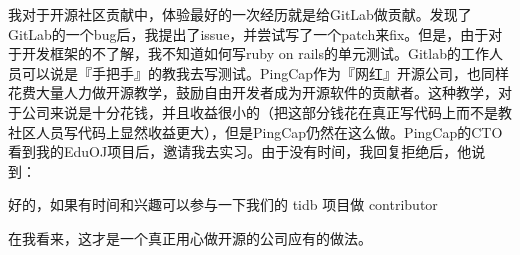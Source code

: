 \documentclass{ctexrep}
\begin{document}
我对于开源社区贡献中，体验最好的一次经历就是给GitLab做贡献。发现了GitLab的一个bug后，我提出了issue，并尝试写了一个patch来fix。但是，由于对于开发框架的不了解，我不知道如何写ruby on rails的单元测试。Gitlab的工作人员可以说是『手把手』的教我去写测试。PingCap作为『网红』开源公司，也同样花费大量人力做开源教学，鼓励自由开发者成为开源软件的贡献者。这种教学，对于公司来说是十分花钱，并且收益很小的（把这部分钱花在真正写代码上而不是教社区人员写代码上显然收益更大），但是PingCap仍然在这么做。PingCap的CTO看到我的EduOJ项目后，邀请我去实习。由于没有时间，我回复拒绝后，他说到：

\begin{displayquote}
    好的，如果有时间和兴趣可以参与一下我们的 tidb 项目做 contributor
\end{displayquote}

在我看来，这才是一个真正用心做开源的公司应有的做法。
\end{document}
